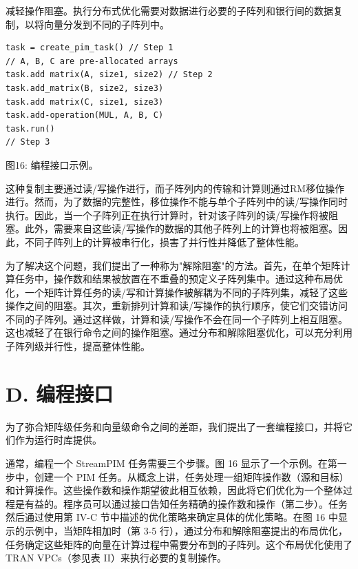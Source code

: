 \documentclass[10pt]{article}
\begin{document}
减轻操作阻塞。执行分布式优化需要对数据进行必要的子阵列和银行间的数据复制，以将向量分发到不同的子阵列中。

\begin{verbatim}
task = create_pim_task() // Step 1
// A, B, C are pre-allocated arrays
task.add matrix(A, size1, size2) // Step 2
task.add_matrix(B, size2, size3)
task.add matrix(C, size1, size3)
task.add-operation(MUL, A, B, C)
task.run()
// Step 3
\end{verbatim}


图16: 编程接口示例。

这种复制主要通过读/写操作进行，而子阵列内的传输和计算则通过RM移位操作进行。然而，为了数据的完整性，移位操作不能与单个子阵列中的读/写操作同时执行。因此，当一个子阵列正在执行计算时，针对该子阵列的读/写操作将被阻塞。此外，需要来自这些读/写操作的数据的其他子阵列上的计算也将被阻塞。因此，不同子阵列上的计算被串行化，损害了并行性并降低了整体性能。

为了解决这个问题，我们提出了一种称为"解除阻塞"的方法。首先，在单个矩阵计算任务中，操作数和结果被放置在不重叠的预定义子阵列集中。通过这种布局优化，一个矩阵计算任务的读/写和计算操作被解耦为不同的子阵列集，减轻了这些操作之间的阻塞。其次，重新排列计算和读/写操作的执行顺序，使它们交错访问不同的子阵列。通过这样做，计算和读/写操作不会在同一个子阵列上相互阻塞。这也减轻了在银行命令之间的操作阻塞。通过分布和解除阻塞优化，可以充分利用子阵列级并行性，提高整体性能。

\section*{D. 编程接口}

为了弥合矩阵级任务和向量级命令之间的差距，我们提出了一套编程接口，并将它们作为运行时库提供。

通常，编程一个 StreamPIM 任务需要三个步骤。图 16 显示了一个示例。在第一步中，创建一个 PIM 任务。从概念上讲，任务处理一组矩阵操作数（源和目标）和计算操作。这些操作数和操作期望彼此相互依赖，因此将它们优化为一个整体过程是有益的。程序员可以通过接口告知任务精确的操作数和操作（第二步）。任务然后通过使用第 IV-C 节中描述的优化策略来确定具体的优化策略。在图 16 中显示的示例中，当矩阵相加时（第 3-5 行），通过分布和解除阻塞提出的布局优化，任务确定这些矩阵的向量在计算过程中需要分布到的子阵列。这个布局优化使用了 TRAN VPCs（参见表 II）来执行必要的复制操作。
\end{document}
